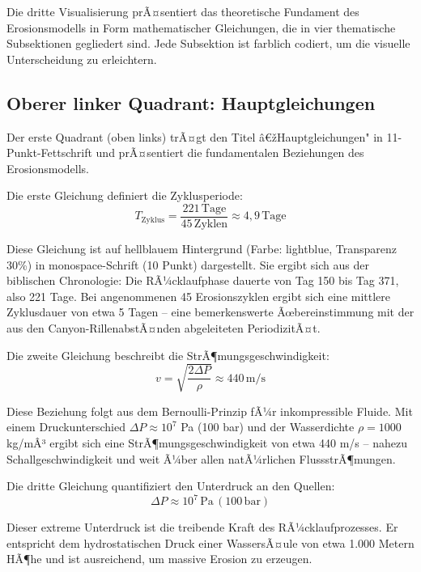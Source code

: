 ﻿\documentclass[12pt,a4paper]{report}
\begin{document}
Die dritte Visualisierung prÃ¤sentiert das theoretische Fundament des Erosionsmodells in Form mathematischer Gleichungen, die in vier thematische Subsektionen gegliedert sind. Jede Subsektion ist farblich codiert, um die visuelle Unterscheidung zu erleichtern.

\subsection{Oberer linker Quadrant: Hauptgleichungen}

Der erste Quadrant (oben links) trÃ¤gt den Titel â€žHauptgleichungen" in 11-Punkt-Fettschrift und prÃ¤sentiert die fundamentalen Beziehungen des Erosionsmodells.

Die erste Gleichung definiert die Zyklusperiode:
\begin{equation*}
	T_{\mathrm{Zyklus}} = \frac{221 \, \mathrm{Tage}}{45 \, \mathrm{Zyklen}} \approx 4{,}9 \, \mathrm{Tage}
\end{equation*}

Diese Gleichung ist auf hellblauem Hintergrund (Farbe: lightblue, Transparenz 30\%) in monospace-Schrift (10 Punkt) dargestellt. Sie ergibt sich aus der biblischen Chronologie: Die RÃ¼cklaufphase dauerte von Tag 150 bis Tag 371, also 221 Tage. Bei angenommenen 45 Erosionszyklen ergibt sich eine mittlere Zyklusdauer von etwa 5 Tagen -- eine bemerkenswerte Ãœbereinstimmung mit der aus den Canyon-RillenabstÃ¤nden abgeleiteten PeriodizitÃ¤t.

Die zweite Gleichung beschreibt die StrÃ¶mungsgeschwindigkeit:
\begin{equation*}
	v = \sqrt{\frac{2 \Delta P}{\rho}} \approx 440 \, \mathrm{m/s}
\end{equation*}

Diese Beziehung folgt aus dem Bernoulli-Prinzip fÃ¼r inkompressible Fluide. Mit einem Druckunterschied $\Delta P \approx 10^7$ Pa (100 bar) und der Wasserdichte $\rho = 1000$ kg/mÂ³ ergibt sich eine StrÃ¶mungsgeschwindigkeit von etwa 440 m/s -- nahezu Schallgeschwindigkeit und weit Ã¼ber allen natÃ¼rlichen FlussstrÃ¶mungen.

Die dritte Gleichung quantifiziert den Unterdruck an den Quellen:
\begin{equation*}
	\Delta P \approx 10^7 \, \mathrm{Pa} \, (100 \, \mathrm{bar})
\end{equation*}

Dieser extreme Unterdruck ist die treibende Kraft des RÃ¼cklaufprozesses. Er entspricht dem hydrostatischen Druck einer WassersÃ¤ule von etwa 1.000 Metern HÃ¶he und ist ausreichend, um massive Erosion zu erzeugen.
\end{document}
